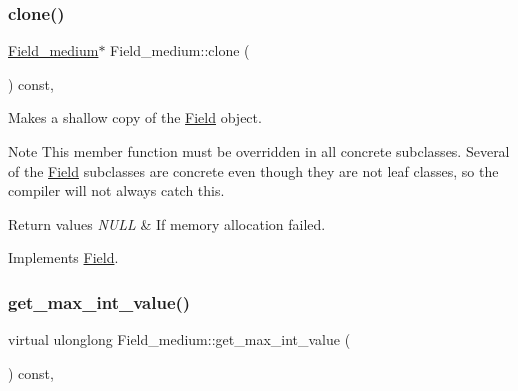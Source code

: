 \mbox{\label{classField__medium_a4fdbb87b4163ca66467d2e4aabea6b4d}} 
\subsubsection{\texorpdfstring{clone()}{clone()}\hspace{0.1cm}{\footnotesize\ttfamily [2/2]}}
{\footnotesize\ttfamily \mbox{\hyperlink{classField__medium}{Field\+\_\+medium}}$\ast$ Field\+\_\+medium\+::clone (\begin{DoxyParamCaption}{ }\end{DoxyParamCaption}) const\hspace{0.3cm}{\ttfamily [inline]}, {\ttfamily [virtual]}}

Makes a shallow copy of the \mbox{\hyperlink{classField}{Field}} object.

\begin{DoxyNote}{Note}
This member function must be overridden in all concrete subclasses. Several of the \mbox{\hyperlink{classField}{Field}} subclasses are concrete even though they are not leaf classes, so the compiler will not always catch this.
\end{DoxyNote}

\begin{DoxyRetVals}{Return values}
{\em N\+U\+LL} & If memory allocation failed. \\
\hline
\end{DoxyRetVals}


Implements \mbox{\hyperlink{classField_a01a9a9aa3a618941e839b1b8793c969d}{Field}}.

\mbox{\label{classField__medium_a0b9e2f14c21e9312a9f014f24a9f95d3}} 
\subsubsection{\texorpdfstring{get\+\_\+max\+\_\+int\+\_\+value()}{get\_max\_int\_value()}}
{\footnotesize\ttfamily virtual ulonglong Field\+\_\+medium\+::get\+\_\+max\+\_\+int\+\_\+value (\begin{DoxyParamCaption}{ }\end{DoxyParamCaption}) const\hspace{0.3cm}{\ttfamily [inline]}, {\ttfamily [virtual]}}

